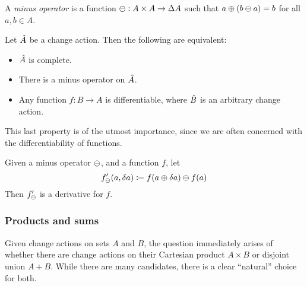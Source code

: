 \begin{defn}
  A \emph{minus operator} is a function $\ominus: A \times A \rightarrow
  \Delta A$ such that $a \oplus (b \ominus a) = b$ for all $a, b \in A$.
\end{defn}

\begin{prop}
  Let $\hat{A}$ be a change action. Then the following are equivalent:
  \begin{itemize}
    \item $\hat{A}$ is complete.
    \item There is a minus operator on $\hat{A}$.
    \item Any function $f: {B} \rightarrow {A}$ is differentiable, where $\hat{B}$ is an arbitrary change action.
  \end{itemize}
\end{prop}

This last property is of the utmost importance, since we are often concerned with the differentiability
of functions.

\begin{prop}
  \label{prop:minusDerivatives}
  Given a minus operator $\ominus$, and a function $f$, let
  \begin{displaymath}
    f'_\ominus(a, \delta a) \coloneqq f(a \oplus \delta a) \ominus f(a)
  \end{displaymath}
  Then $f'_\ominus$ is a derivative for $f$.
\end{prop}

\subsubsection{Products and sums}

Given change actions on sets $A$ and $B$, the question immediately arises of whether there are
change actions on their Cartesian product $A \times B$ or disjoint union $A + B$. While there are
many candidates, there is a clear ``natural'' choice for both.

